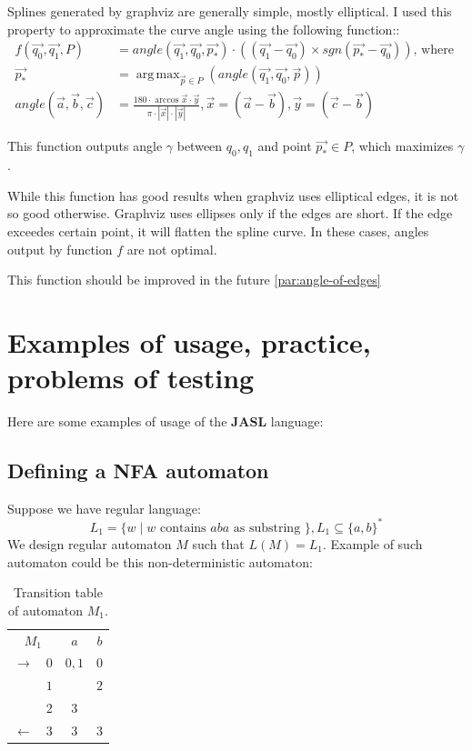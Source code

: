 \documentclass{ctuthesis}
\DeclareMathOperator*{\argmax}{arg\,max}
\begin{document}
Splines generated by graphviz are generally simple, mostly elliptical. I used this property to approximate the curve angle using the following function::
\begin{align*}
	f(\vec{q_0}, \vec{q_1}, P) &= angle(\vec{q_1}, \vec{q_0}, \vec{p_*}) \cdot ((\vec{q_1} - \vec{q_0})\times sgn(\vec{p_*} - \vec{q_0})) \text{, where } \\
	\vec{p_*} &= \argmax_{\vec{p} \in P} (angle(\vec{q_1}, \vec{q_0}, \vec{p})) \\
	angle(\vec{a}, \vec{b}, \vec{c}) &= \frac{
		180 \cdot \arccos{ \vec{x} \cdot \vec{y} }}{ \pi \cdot |\vec{x}| \cdot |\vec{y}| }, \vec{x} = (\vec{a} - \vec{b}), \vec{y} = (\vec{c}-\vec{b})
\end{align*}

This function outputs angle $\gamma$ between $q_0, q_1$ and point $\vec{p_*} \in P$, which maximizes $\gamma$. 

While this function has good results when graphviz uses elliptical edges, it is not so good otherwise. Graphviz uses ellipses only if the edges are short. If the edge exceedes certain point, it will flatten the spline curve. In these cases, angles output by function $f$ are not optimal. 

This function should be improved in the future \ref{par:angle-of-edges}

\chapter{Examples of usage, practice, problems of testing}
Here are some examples of usage of the \textbf{JASL} language: 

\section{Defining a NFA automaton}
\label{sec:example_NFA}
Suppose we have regular language: 
\begin{equation*}
L_1 = \{w \mid w \text{ contains } aba \text{ as substring }\}, L_1 \subseteq \{a, b\}^*
\end{equation*} 
We design regular automaton $M$ such that $L(M) = L_1$. Example of such automaton could be this non-deterministic automaton:
\begin{table}[H]
\begin{ctucolortab}
\begin{tabular}{cc|cc}
\multicolumn{2}{c}{\bfseries $M_1$} & \bfseries $a$ & \bfseries $b$ \\\Midrule
$\rightarrow$ 	& $0$ & $0,1$ 	& $0$  \\
				& $1$ &  	& $2$  \\
				& $2$ & $3$		&  \\
$\leftarrow$	& $3$ & $3$		& $3$ 
\end{tabular}
\end{ctucolortab}
\caption{Transition table of automaton $M_1$.}
\label{fig:examples_NFA_table}
\end{table} 
\end{document}
